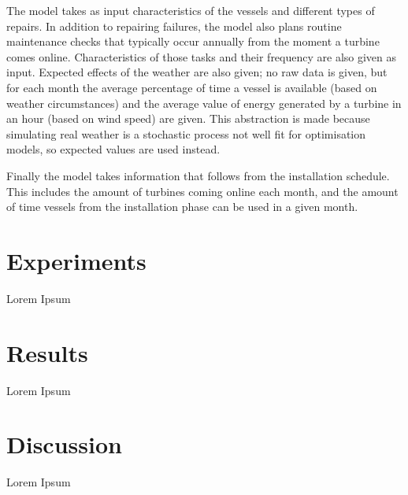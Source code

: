 \documentclass[a4paper,12pt]{report}
\begin{document}
The model takes as input characteristics of the vessels and different types of repairs. In addition to repairing failures, the model also plans routine maintenance checks that typically occur annually from the moment a turbine comes online. Characteristics of those tasks and their frequency are also given as input. Expected effects of the weather are also given; no raw data is given, but for each month the average percentage of time a vessel is available (based on weather circumstances) and the average value of energy generated by a turbine in an hour (based on wind speed) are given. This abstraction is made because simulating real weather is a stochastic process not well fit for optimisation models, so expected values are used instead. 

Finally the model takes information that follows from the installation schedule. This includes the amount of turbines coming online each month, and the amount of time vessels from the installation phase can be used in a given month. %

\section{Experiments} \label{s:expr}
Lorem Ipsum %

\section{Results} \label{s:resul}
Lorem Ipsum %

\section{Discussion} \label{s:disc}
Lorem Ipsum %

\pagebreak



\end{document}
